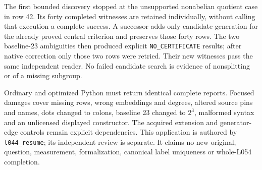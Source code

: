 \documentclass[11pt]{article}
\begin{document}
The first bounded discovery stopped at the unsupported nonabelian quotient
case in row 42. Its forty completed witnesses are retained individually,
without calling that execution a complete success. A successor adds only
candidate generation for the already proved central criterion and preserves
those forty rows. The two baseline-23 ambiguities then produced explicit
\texttt{NO\_CERTIFICATE} results; after native correction only those two rows
were retried. Their new witnesses pass the same independent reader. No failed
candidate search is evidence of nonsplitting or of a missing subgroup.

Ordinary and optimized Python must return identical complete reports.
Focused damages cover missing rows, wrong embeddings and degrees, altered
source pins and names, dots changed to colons, baseline 23 changed to $2^3$,
malformed syntax and an unlicensed displayed constructor. The acquired
extension and generator-edge controls remain explicit dependencies. This
application is authored by \texttt{l044\_resume}; its independent review is
separate. It claims no new original, question, measurement, formalization,
canonical label uniqueness or whole-L054 completion.
\end{document}
